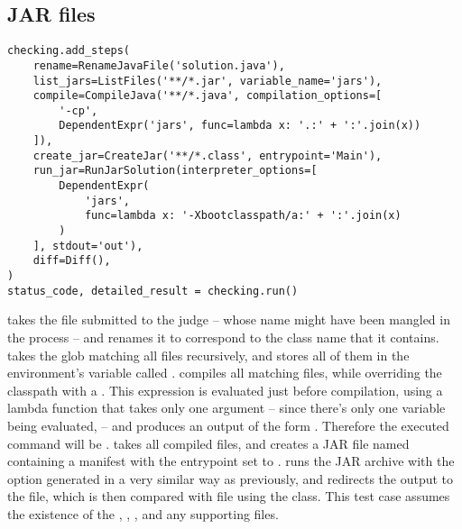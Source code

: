 \subsection{JAR files}

\begin{verbatim}
checking.add_steps(
    rename=RenameJavaFile('solution.java'),
    list_jars=ListFiles('**/*.jar', variable_name='jars'),
    compile=CompileJava('**/*.java', compilation_options=[
        '-cp',
        DependentExpr('jars', func=lambda x: '.:' + ':'.join(x))
    ]),
    create_jar=CreateJar('**/*.class', entrypoint='Main'),
    run_jar=RunJarSolution(interpreter_options=[
        DependentExpr(
            'jars',
            func=lambda x: '-Xbootclasspath/a:' + ':'.join(x)
        )
    ], stdout='out'),
    diff=Diff(),
)
status_code, detailed_result = checking.run()
\end{verbatim}

 takes the file submitted to the judge -- whose name might have been mangled in the process -- and
renames it to correspond to the class name that it contains.
 takes the glob matching all  files recursively, and stores all of them in the environment's
variable called .
 compiles all matching  files, while overriding the classpath with a
.
This expression is evaluated just before compilation, using a lambda function that takes only one argument -- since
there's only one variable being evaluated,  -- and produces an output of the form
.
Therefore the executed command will be .
 takes all compiled  files, and creates a JAR file named 
containing a manifest with the entrypoint set to .
 runs the JAR archive with the  option generated in a very similar way as
previously, and redirects the output to the  file, which is then compared with  file using the
 class.
This test case assumes the existence of the , , , and any supporting
 files.
